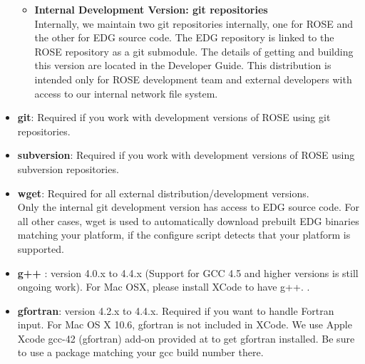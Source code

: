 \begin{itemize}
\begin{itemize}
       \item {\bf Internal Development Version: git repositories} \\
       Internally, we maintain two git repositories internally, one for ROSE and the
       other for EDG source code. The EDG repository is linked to the ROSE
       repository as a git submodule. 
       The details of getting and building this version are located in the
       Developer Guide. %
       This distribution is intended only for ROSE development team
       and external developers with access to our internal network file
       system.  
     \end{itemize}

  \item {\bf git}: Required if you work with development versions of ROSE
  using git repositories.

  \item {\bf subversion}: Required if you work with development versions of ROSE
  using subversion repositories.

  \item {\bf wget}: Required for all external distribution/development
  versions. \\
  Only the internal git development version has access to EDG source code.
  For all other cases,  wget is used to automatically download prebuilt EDG binaries matching
  your platform, if the configure script detects that your platform is supported. 

   \item {\bf g++} : version 4.0.x to 4.4.x (Support for GCC 4.5 and higher
   versions is still ongoing work). For Mac OSX, please install XCode to
   have g++. .

   \item {\bf gfortran}: version 4.2.x to 4.4.x. Required if you want to
   handle Fortran input. For Mac OS X 10.6, gfortran is not included in
   XCode. We use Apple Xcode gcc-42 (gfortran) add-on provided at
   to get gfortran installed. Be sure to use a package matching your gcc
   build number there. 


\end{itemize}
